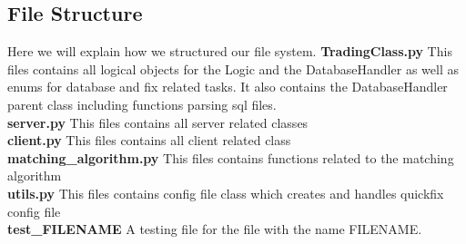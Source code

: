 \documentclass[a4paper, 11pt]{article}
\begin{document}
\noindent
{}

\subsection*{File Structure}
Here we will explain how we structured our file system.
\textbf{TradingClass.py} This files contains all logical objects for the Logic and the DatabaseHandler as well as enums for database and fix
related tasks. It also contains the DatabaseHandler parent class including functions parsing sql files. \\
\textbf{server.py} This files contains all server related classes \\
\textbf{client.py} This files contains all client related class \\
\textbf{matching\_algorithm.py} This files contains functions related to the matching algorithm \\
\textbf{utils.py} This files contains config file class which creates and handles quickfix config file \\
\textbf{test\_FILENAME} A testing file for the file with the name FILENAME. \\
\end{document}
